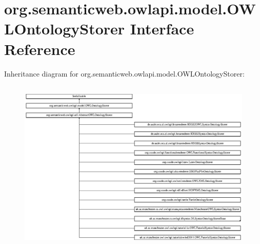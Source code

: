 \hypertarget{interfaceorg_1_1semanticweb_1_1owlapi_1_1model_1_1_o_w_l_ontology_storer}{\section{org.\-semanticweb.\-owlapi.\-model.\-O\-W\-L\-Ontology\-Storer Interface Reference}
\label{interfaceorg_1_1semanticweb_1_1owlapi_1_1model_1_1_o_w_l_ontology_storer}
}
Inheritance diagram for org.\-semanticweb.\-owlapi.\-model.\-O\-W\-L\-Ontology\-Storer\-:\begin{figure}[H]
\begin{center}
\leavevmode
\includegraphics[height=8.358209cm]{interfaceorg_1_1semanticweb_1_1owlapi_1_1model_1_1_o_w_l_ontology_storer}
\end{center}
\end{figure}
